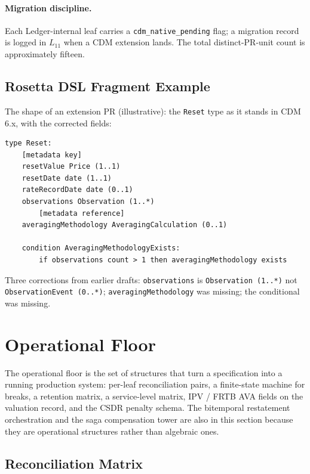 \documentclass[11pt,a4paper]{article}
\begin{document}
\paragraph{Migration discipline.} Each Ledger-internal leaf carries a \texttt{cdm\_native\_pending} flag; a migration record is logged in $L_{11}$ when a CDM extension lands. The total distinct-PR-unit count is approximately fifteen.

\subsection{Rosetta DSL Fragment Example}
\label{sec:cdm-rosetta-fragment}

The shape of an extension PR (illustrative): the \texttt{Reset} type as it stands in CDM 6.x, with the corrected fields:

\begin{lstlisting}
type Reset:
    [metadata key]
    resetValue Price (1..1)
    resetDate date (1..1)
    rateRecordDate date (0..1)
    observations Observation (1..*)
        [metadata reference]
    averagingMethodology AveragingCalculation (0..1)

    condition AveragingMethodologyExists:
        if observations count > 1 then averagingMethodology exists
\end{lstlisting}

Three corrections from earlier drafts: \texttt{observations} is \texttt{Observation (1..*)} not \texttt{ObservationEvent (0..*)}; \texttt{averagingMethodology} was missing; the conditional was missing.

\clearpage
\section{Operational Floor}
\label{sec:operational}

The operational floor is the set of structures that turn a specification into a running production system: per-leaf reconciliation pairs, a finite-state machine for breaks, a retention matrix, a service-level matrix, IPV / FRTB AVA fields on the valuation record, and the CSDR penalty schema. The bitemporal restatement orchestration and the saga compensation tower are also in this section because they are operational structures rather than algebraic ones.

\subsection{Reconciliation Matrix}
\label{sec:operational-reconciliation}
\end{document}

